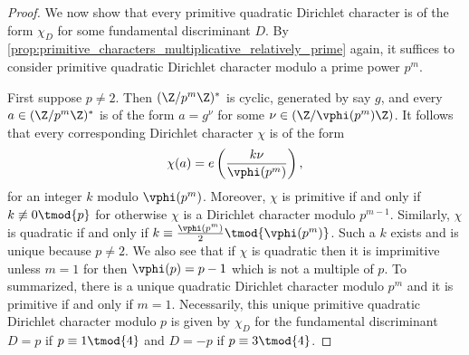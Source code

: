 \documentclass[12pt]{article}
\begin{document}
\begin{proof}
        We now show that every primitive quadratic Dirichlet character is of the form \(\chi_{D}\) for some fundamental discriminant \(D\). By \cref{prop:primitive_characters_multiplicative_relatively_prime} again, it suffices to consider primitive quadratic Dirichlet character modulo a prime power \(p^{m}\).
        
        First suppose \(p \neq 2\). Then \((\Z/p^{m}\Z)^{\ast}\) is cyclic, generated by say \(g\), and every \(a \in (\Z/p^{m}\Z)^{\ast}\) is of the form \(a = g^{\nu}\) for some \(\nu \in (\Z/\vphi(p^{m})\Z)\). It follows that every corresponding Dirichlet character \(\chi\) is of the form
        \[
          \chi(a) = e\left(\frac{k\nu}{\vphi(p^{m})}\right),
        \]
        for an integer \(k\) modulo \(\vphi(p^{m})\). Moreover, \(\chi\) is primitive if and only if \(k \not\equiv 0 \tmod{p}\) for otherwise \(\chi\) is a Dirichlet character modulo \(p^{m-1}\). Similarly, \(\chi\) is quadratic if and only if \(k \equiv \frac{\vphi(p^{m})}{2} \tmod{\vphi(p^{m})}\). Such a \(k\) exists and is unique because \(p \neq 2\). We also see that if \(\chi\) is quadratic then it is imprimitive unless \(m = 1\) for then \(\vphi(p) = p-1\) which is not a multiple of \(p\). To summarized, there is a unique quadratic Dirichlet character modulo \(p^{m}\) and it is primitive if and only if \(m = 1\). Necessarily, this unique primitive quadratic Dirichlet character modulo \(p\) is given by \(\chi_{D}\) for the fundamental discriminant \(D = p\) if \(p \equiv 1 \tmod{4}\) and \(D = -p\) if \(p \equiv 3 \tmod{4}\).
        

\end{proof}
\end{document}
